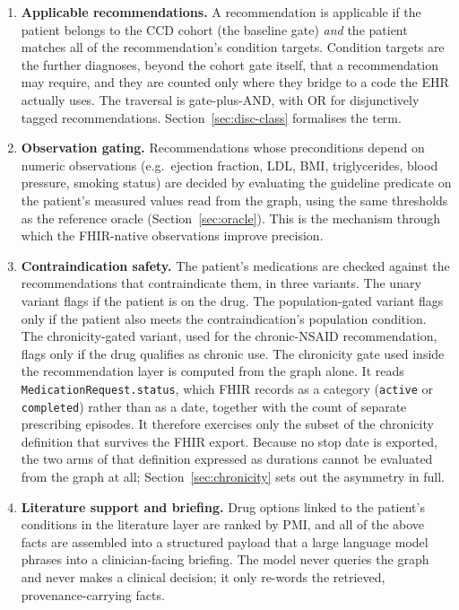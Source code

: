 \begin{enumerate}
    \item \textbf{Applicable recommendations.} A recommendation is applicable if the patient
    belongs to the CCD cohort (the baseline gate) \emph{and} the patient matches all of the
    recommendation's condition targets. Condition targets are the further diagnoses, beyond
    the cohort gate itself, that a recommendation may require, and they are counted only
    where they bridge to a code the EHR actually uses. The traversal is gate-plus-AND, with
    OR for disjunctively tagged recommendations.
    Section~\ref{sec:disc-class} formalises the term.
    \item \textbf{Observation gating.} Recommendations whose preconditions depend on numeric
    observations (e.g.\ ejection fraction, LDL, BMI, triglycerides, blood pressure, smoking
    status) are decided by evaluating the guideline predicate on the patient's measured
    values read from the graph, using the same thresholds as the reference oracle
    (Section~\ref{sec:oracle}). This is the mechanism through which the FHIR-native
    observations improve precision.
    \item \textbf{Contraindication safety.} The patient's medications are checked against
    the recommendations that contraindicate them, in three variants. The unary variant flags
    if the patient is on the drug. The population-gated variant flags only if the patient
    also meets the contraindication's population condition. The chronicity-gated variant,
    used for the chronic-NSAID recommendation, flags only if the drug qualifies as chronic
    use. The chronicity gate used inside the recommendation layer is computed from the graph alone.
    It reads \texttt{MedicationRequest.status}, which FHIR records as a category
    (\texttt{active} or \texttt{completed}) rather than as a date, together with the count
    of separate prescribing episodes. It therefore exercises only the subset of the
    chronicity definition that survives the FHIR export. Because no stop date is exported, the two arms
    of that definition expressed as durations cannot be evaluated from the graph at all;
    Section~\ref{sec:chronicity} sets out the asymmetry in full.
    \item \textbf{Literature support and briefing.} Drug options linked to the patient's
    conditions in the literature layer are ranked by PMI, and all of the above facts are
    assembled into a structured payload that a large language model phrases into a
    clinician-facing briefing. The model never queries the graph and never makes a clinical
    decision; it only re-words the retrieved, provenance-carrying facts.
\end{enumerate}

